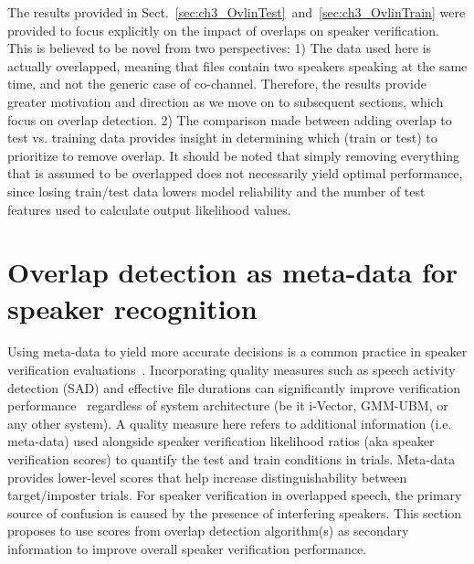 The results provided in Sect.~\ref{sec:ch3_OvlinTest}~and~\ref{sec:ch3_OvlinTrain} were provided to focus explicitly on the impact of overlaps on speaker verification. 
This is believed to be novel from two perspectives: 
1) The data used here is actually overlapped, meaning that files contain two speakers speaking at the same time, and not the generic case of co-channel. Therefore, the results provide greater motivation and direction as we move on to subsequent sections, which focus on overlap detection. 
2) The comparison made between adding overlap to test vs. training data provides insight in determining which (train or test) to prioritize to remove overlap. It should be noted that simply removing everything that is assumed to be overlapped does not necessarily yield optimal performance, since losing train/test data lowers model reliability and the number of test features used to calculate output likelihood values. 


\section{Overlap detection as meta-data for speaker recognition}
\label{sec:ch2_OvlQualityMeasure} 
Using meta-data to yield more accurate decisions is a common practice in speaker verification evaluations~\cite{bosaris,qual_sid_13}. 
Incorporating quality measures such as speech activity detection (SAD) and effective file durations can significantly improve verification performance~\cite{qual_sid_13,hasan2013crss} regardless of system architecture (be it i-Vector, GMM-UBM, or any other system). 
A quality measure here refers to additional information (i.e. meta-data) used alongside speaker verification likelihood ratios (aka speaker verification scores) to quantify the test and train conditions in trials. 
Meta-data provides lower-level scores that help increase distinguishability between target/imposter trials. 
For speaker verification in overlapped speech, the primary source of confusion is caused by the presence of interfering speakers. 
This section proposes to use scores from overlap detection algorithm(s) as secondary information to improve overall speaker verification performance. 

